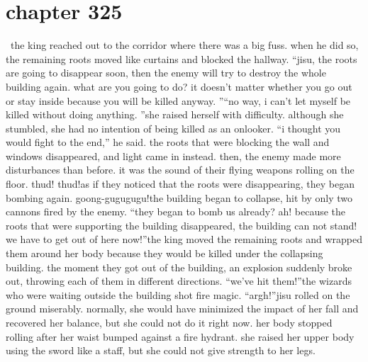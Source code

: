 \section{chapter 325}






 the king reached out to the corridor where there was a big fuss.
 when he did so, the remaining roots moved like curtains and blocked the hallway.
“jisu, the roots are going to disappear soon, then the enemy will try to destroy the whole building again.
 what are you going to do? it doesn’t matter whether you go out or stay inside because you will be killed anyway.
”“no way, i can’t let myself be killed without doing anything.
”she raised herself with difficulty.
 although she stumbled, she had no intention of being killed as an onlooker.
“i thought you would fight to the end,” he said.
the roots that were blocking the wall and windows disappeared, and light came in instead.
 then, the enemy made more disturbances than before.
 it was the sound of their flying weapons rolling on the floor.
thud! thud!as if they noticed that the roots were disappearing, they began bombing again.
goong-gugugugu!the building began to collapse, hit by only two cannons fired by the enemy.
“they began to bomb us already? ah! because the roots that were supporting the building disappeared, the building can not stand! we have to get out of here now!”the king moved the remaining roots and wrapped them around her body because they would be killed under the collapsing building.
the moment they got out of the building, an explosion suddenly broke out, throwing each of them in different directions.
“we’ve hit them!”the wizards who were waiting outside the building shot fire magic.
“argh!”jisu rolled on the ground miserably.
 normally, she would have minimized the impact of her fall and recovered her balance, but she could not do it right now.
her body stopped rolling after her waist bumped against a fire hydrant.
 she raised her upper body using the sword like a staff, but she could not give strength to her legs.


